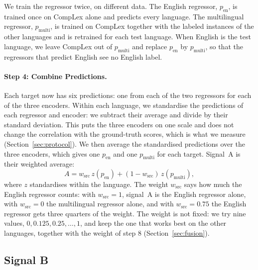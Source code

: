 \documentclass[11pt]{article}
\begin{document}
We train the regressor twice, on different data. The English regressor, $p_{\mathrm{en}}$, is
trained once on CompLex alone and predicts every language. The multilingual regressor, %
$p_{\mathrm{multi}}$, is trained on CompLex together with the labeled instances of the other
languages and is retrained for each test language. When English is the test language, we leave %
CompLex out of $p_{\mathrm{multi}}$ and replace $p_{\mathrm{en}}$ by $p_{\mathrm{multi}}$, so that %
the regressors that predict English see no English label.

\paragraph{Step 4: Combine Predictions.} Each target now has six predictions: one from each of the
two regressors for each of the three encoders. Within each language, we standardise the predictions %
of each regressor and encoder: we subtract their average and divide by their standard deviation.
This puts the three encoders on one scale and does not change the correlation with the ground-truth scores,
which is what we measure (Section~\ref{sec:protocol}). We then average the standardised predictions
over the three encoders, which gives one $p_{\mathrm{en}}$ and one $p_{\mathrm{multi}}$ for each
target. Signal~A is their weighted average:
\begin{equation}
A = w_{\mathrm{src}}\, z(p_{\mathrm{en}}) + (1 - w_{\mathrm{src}})\, z(p_{\mathrm{multi}}),
\label{eq:arms}
\end{equation}
where $z$ standardises within the language. The weight $w_{\mathrm{src}}$ says how much the %
English regressor counts: with $w_{\mathrm{src}} = 1$, signal~A is the English regressor alone, with
$w_{\mathrm{src}} = 0$ the multilingual regressor alone, and with $w_{\mathrm{src}} = 0.75$ the
English regressor gets three quarters of the weight. The weight is not fixed: we try nine values,
$0, 0.125, 0.25, \dots, 1$, and keep the one that works best on the other languages, together with %
the weight of step 8 (Section~\ref{sec:fusion}).

\subsection{Signal B}
\label{sec:signal-b}
\end{document}
